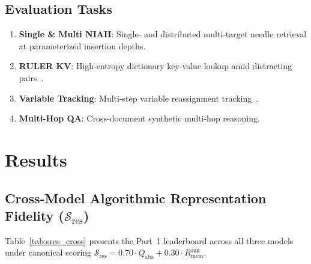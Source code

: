 \documentclass[10pt]{article}
\theoremstyle{definition}
\begin{document}
\subsection{Evaluation Tasks}
\begin{enumerate}[leftmargin=*,itemsep=0.5pt,topsep=1.5pt]
    \item \textbf{Single \& Multi NIAH}: Single- and distributed multi-target needle retrieval at parameterized insertion depths.
    \item \textbf{RULER KV}: High-entropy dictionary key-value lookup amid distracting pairs~\citep{hsieh2024ruler}.
    \item \textbf{Variable Tracking}: Multi-step variable reassignment tracking~\citep{hsieh2024ruler}.
    \item \textbf{Multi-Hop QA}: Cross-document synthetic multi-hop reasoning.
\end{enumerate}

\section{Results}
\label{sec:results}

\subsection{Cross-Model Algorithmic Representation Fidelity (\texorpdfstring{$\mathcal{S}_{\text{res}}$}{S\_res})}

Table~\ref{tab:sres_cross} presents the Part~1 leaderboard across all three models under canonical scoring $\mathcal{S}_{\text{res}} = 0.70 \cdot Q_{\text{abs}} + 0.30 \cdot R_{\text{mem}}^{\text{agg}}$.
\end{document}
